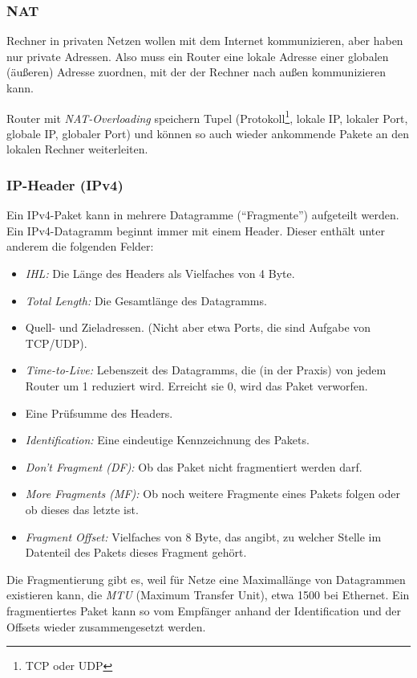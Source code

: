 \documentclass[a4paper,parskip=half*,DIV=15,fontsize=11pt]{scrartcl}
\begin{document}
\subsubsection{NAT}

Rechner in privaten Netzen wollen mit dem Internet kommunizieren, aber haben nur private Adressen. Also muss ein Router eine lokale Adresse einer globalen (äußeren) Adresse zuordnen, mit der der Rechner nach außen kommunizieren kann.

Router mit \emph{NAT-Overloading} speichern Tupel (Protokoll\footnote{TCP oder UDP}, lokale IP, lokaler Port, globale IP, globaler Port) und können so auch wieder ankommende Pakete an den lokalen Rechner weiterleiten.

\subsubsection{IP-Header (IPv4)}

Ein IPv4-Paket kann in mehrere Datagramme (``Fragmente'') aufgeteilt werden.
Ein IPv4-Datagramm beginnt immer mit einem Header. Dieser enthält unter anderem die folgenden Felder:

\begin{itemize}
\item \emph{IHL:} Die Länge des Headers als Vielfaches von 4 Byte.
\item \emph{Total Length:} Die Gesamtlänge des Datagramms.
\item Quell- und Zieladressen. (Nicht aber etwa Ports, die sind Aufgabe von TCP/UDP).
\item \emph{Time-to-Live:} Lebenszeit des Datagramms, die (in der Praxis) von jedem Router um 1 reduziert wird. Erreicht sie 0, wird das Paket verworfen.
\item Eine Prüfsumme des Headers.
\item \emph{Identification:} Eine eindeutige Kennzeichnung des Pakets.
\item \emph{Don't Fragment (DF):} Ob das Paket nicht fragmentiert werden darf.
\item \emph{More Fragments (MF):} Ob noch weitere Fragmente eines Pakets folgen oder ob dieses das letzte ist.
\item \emph{Fragment Offset:} Vielfaches von 8 Byte, das angibt, zu welcher Stelle im Datenteil des Pakets dieses Fragment gehört.
\end{itemize}

Die Fragmentierung gibt es, weil für Netze eine Maximallänge von Datagrammen existieren kann, die \emph{MTU} (Maximum Transfer Unit), etwa \SI{1500}{\byte} bei Ethernet. Ein fragmentiertes Paket kann so vom Empfänger anhand der Identification und der Offsets wieder zusammengesetzt werden.
\end{document}
